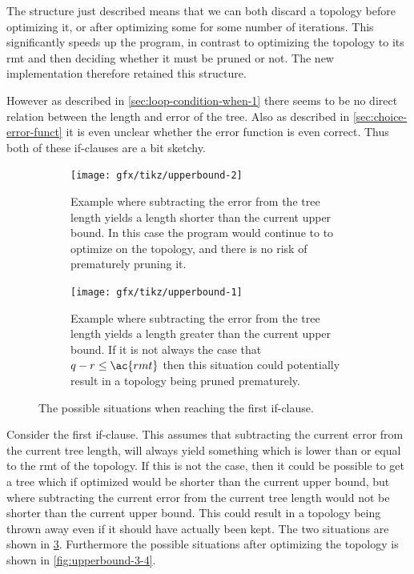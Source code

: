 The structure just described means that we can both discard a topology before
optimizing it, or after optimizing some for some number of iterations. This
significantly speeds up the program, in contrast to optimizing the topology to
its \ac{rmt} and then deciding whether it must be pruned or not. The new
implementation therefore retained this structure.

However as described in \cref{sec:loop-condition-when-1} there seems to be no
direct relation between the length and error of the tree. Also as described in
\cref{sec:choice-error-funct} it is even unclear whether the error function is
even correct. Thus both of these if-clauses are a bit sketchy.

\begin{figure}[htbp]
  \centering
  \begin{subfigure}[t]{0.4\textwidth}
    \texttt{[image: gfx/tikz/upperbound-2]}
    \caption{Example where subtracting the error from the tree
      length yields a length shorter than the current upper bound. In this case
      the program would continue to to optimize on the topology, and there is no
      risk of prematurely pruning it.\label{fig:upperbound-2}}
  \end{subfigure}\hspace{1em}
  \begin{subfigure}[t]{0.4\textwidth}
    \texttt{[image: gfx/tikz/upperbound-1]}
    \caption{Example where subtracting the error from the tree
      length yields a length greater than the current upper bound. If it is not
      always the case that $q-r \le \ac{rmt}$ then this situation could
      potentially result in a topology being pruned
      prematurely.\label{fig:upperbound-1}}
  \end{subfigure}
  \caption[Upper bounds, 1 and 2]{The possible situations when reaching the
    first if-clause.\label{fig:upperbound-1-2}}
\end{figure}

Consider the first if-clause. This assumes that subtracting the current error
from the current tree length, will always yield something which is lower than or
equal to the \ac{rmt} of the topology. If this is not the case, then it could be
possible to get a tree which if optimized would be shorter than the current
upper bound, but where subtracting the current error from the current tree
length would not be shorter than the current upper bound. This could result in a
topology being thrown away even if it should have actually been kept. The two
situations are shown in \cref{fig:upperbound-1-2}. Furthermore the possible
situations after optimizing the topology is shown in \cref{fig:upperbound-3-4}.

